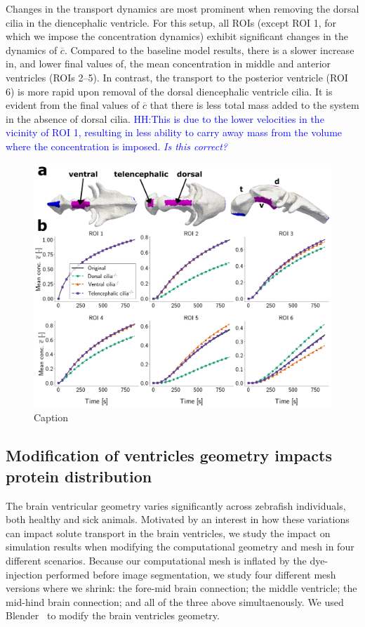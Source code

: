 \documentclass[fleqn]{wlscirep}
\newcommand{\lyng}[1]{\textcolor{blue}{#1}}
\begin{document}
Changes in the transport dynamics are most prominent when removing the dorsal cilia in the diencephalic ventricle. For this setup, all ROIs (except ROI 1, for which we impose the concentration dynamics) exhibit significant changes in the dynamics of $\overline{c}$. Compared to the baseline model results, there is a slower increase in, and lower final values of, the mean concentration in middle and anterior ventricles (ROIs 2--5). In contrast, the transport to the posterior ventricle (ROI 6) is more rapid upon removal of the dorsal diencephalic ventricle cilia. It is evident from the final values of $\overline{c}$ that there is less total mass added to the system in the absence of dorsal cilia. \lyng{HH:This is due to the lower velocities in the vicinity of ROI 1, resulting in less ability to carry away mass from the volume where the concentration is imposed. \emph{Is this correct?}}
\begin{figure}[H]
    \centering
    \includegraphics[width=\textwidth]{graphics/figure5_compare_cilia_modifications.png}
    \caption{Caption}
    \label{fig:figure5_compare_cilia_modifications}
\end{figure}

\subsection*{Modification of ventricles geometry impacts protein distribution}

The brain ventricular geometry varies significantly across zebrafish individuals, both healthy and sick animals. Motivated by an interest in how these variations can impact solute transport in the brain ventricles, we study the impact on simulation results when modifying the computational geometry and mesh in four different scenarios. Because our computational mesh is inflated by the dye-injection performed before image segmentation, we study four different mesh versions where we shrink: the fore-mid brain connection; the middle ventricle; the mid-hind brain connection; and all of the three above simultaenously. We used Blender~\cite{Community2018BlenderPackage} to modify the brain ventricles geometry.
\end{document}
